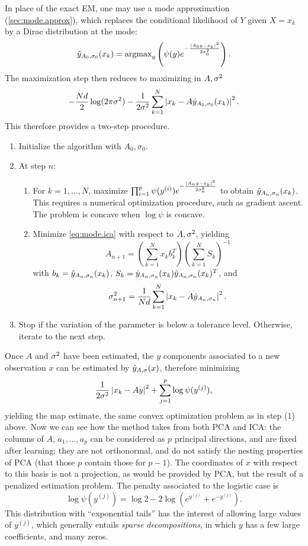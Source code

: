 \bigskip
In place of the exact EM, one may use a mode approximation (\cref{sec:mode.approx}), which  replaces the conditional
likelihood of $Y$ given $X=x_k$
by a Dirac distribution at the mode:
\[
\hat y_{A_0, \sigma_0}(x_k) = \text{argmax}_y \left( \psi(y)
e^{-\frac{|A_0y - x_k|^2}{2\sigma_0^2} }\right).
\]
The maximization step then reduces to maximizing
in $A, \sigma^2$
\begin{equation}
\label{eq:mode.ica}
- \frac{Nd}{2}\log (2\pi\sigma^2)  - \frac{1}{2\sigma^2} \sum_{k=1}^N
\left| x_k- A\hat y_{A_0, \sigma_0}(x_k) \right|^2.
\end{equation}
This therefore provides a  two-step procedure.
\begin{algorithm}
\begin{enumerate}[label=(\arabic*),wide]
\item Initialize the algorithm with $A_0, \sigma_0$. 
\item At step $n$:
\begin{enumerate}[label=(\roman*),wide=1cm]
\item For $k=1, \ldots, N$, maximize $ \prod_{i=1}^p \psi(y^{(i)})
e^{-\frac{|A_ny - x_k|^2}{2\sigma_n^2} }$ to obtain $\hat y_{A_n,\sigma_n}(x_k)$.
This requires a
numerical optimization procedure, such as gradient ascent. The problem is
concave when $\log \psi$ is concave. 
\item Minimize \cref{eq:mode.ica} with
respect to $A, \sigma^2$, yielding
$$ A_{n+1} = \left(\sum_{k=1}^N x_k b_k^T\right)\left(\sum_{k=1}^N S_k\right)^{-1}$$
with $b_{k} = \hat y_{A_n, \sigma_n}(x_k)$, $S_k = \hat y_{A_n,
\sigma_n}(x_k)\hat y_{A_n, \sigma_n}(x_k)^T$, and
$$
\sigma_{n+1}^2 = \frac{1}{Nd} \sum_{k=1}^N \left| x_k- A\hat y_{A_n, \sigma_n} \right|^2.
$$
\end{enumerate}
\item Stop if the variation of the parameter is below a tolerance level. Otherwise, iterate to the next step.
\end{enumerate}
\end{algorithm}


Once $A$ and $\sigma^2$ have been estimated, the $y$
components associated to a new observation $x$ can be estimated by $\hat
y_{A,\sigma}(x)$, therefore minimizing
$$
\frac{1}{2\sigma^2} \left| x_k- Ay \right|^2 + \sum_{j=1}^p  \log \psi(y^{(j)}),
$$
yielding the map estimate, the same convex optimization problem as in
step (1) above. Now we can see how the method takes from both  PCA and
ICA: the columns of $A$, $a_1, \ldots, a_p$ can be considered as  $p$ 
principal directions, and are fixed after learning; they are not
orthonormal, and do not satisfy the nesting properties of PCA (that those $p$
contain those for $p-1$). The coordinates of $x$ with respect to this basis
is not a projection, as would be provided by PCA, but the result of a
penalized estimation problem. The penalty associated to the logistic
case is 
$$
\log \psi(y^{(j)}) =  \log 2 - 2 \log (e^{y^{(j)}} + e^{-y^{(j)}}).
$$
This distribution with ``exponential tails'' has the interest of
allowing large values of $y^{(j)}$, which generally entails {\em sparse
decompositions}, in which $y$ has a few large coefficients, and many
zeros.
\bigskip

